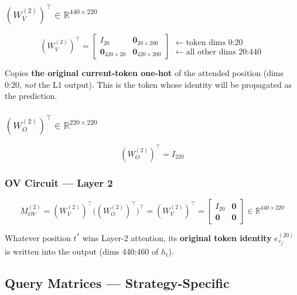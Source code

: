 \documentclass[11pt]{article}
\newcommand{\R}{\mathbb{R}}
\begin{document}
\subsubsection{$(W_V^{(2)})^\top\in\R^{440\times220}$}

\begin{equation}
\boxed{
(W_V^{(2)})^\top=\begin{bmatrix}I_{20} & \mathbf{0}_{20\times200}\\
\mathbf{0}_{420\times20} & \mathbf{0}_{420\times200}\end{bmatrix}
}
\begin{array}{l}\leftarrow\text{token dims }0\text{:}20\\\leftarrow\text{all other dims }20\text{:}440\end{array}
\tag{14}
\end{equation}

Copies \textbf{the original current-token one-hot} of the attended position (dims 0:20, \emph{not} the
L1 output). This is the token whose identity will be propagated as the prediction.

\subsubsection{$(W_O^{(2)})^\top\in\R^{220\times220}$}

\begin{equation}
\boxed{(W_O^{(2)})^\top=I_{220}}
\tag{15}
\end{equation}

\subsubsection{OV Circuit --- Layer 2}

\[
M_{OV}^{(2)}=(W_V^{(2)})^\top\bigl((W_O^{(2)})^\top\bigr)^\top
=(W_V^{(2)})^\top
=\begin{bmatrix}I_{20}&\mathbf{0}\\\mathbf{0}&\mathbf{0}\end{bmatrix}
\in\R^{440\times220}
\tag{16}
\]

Whatever position $t^*$ wins Layer-2 attention, its \textbf{original token identity}
$e_{v_{t^*}}^{(20)}$ is written into the output (dims 440:460 of $h_t$).

\subsection{Query Matrices --- Strategy-Specific}
\end{document}
